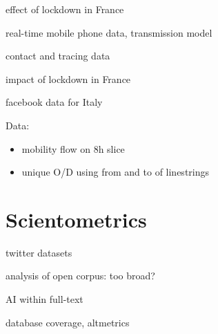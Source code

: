 \documentclass[10pt]{article}
\begin{document}
\cite{pullano2020population} effect of lockdown in France



\cite{jia2020population} real-time mobile phone data, transmission model

\cite{Zhangeabb8001} contact and tracing data


\cite{salje:pasteur-02548181} impact of lockdown in France


\cite{Bonaccorsi15530} facebook data for Italy
	
\cite{kissler2020reductions}
	
Data:

\begin{itemize}
	\item mobility flow on 8h slice
	\item unique O/D using from and to of linestrings
\end{itemize}





\section{Scientometrics}

\cite{inuwadutse2020curated} twitter datasets

\cite{Colavizza2020.04.20.046144} analysis of open corpus: too broad?

\cite{khamsi2020coronavirus} AI within full-text

\cite{2020arXiv200410400K} database coverage, altmetrics

	
	
	
	


	
	
\end{document}
